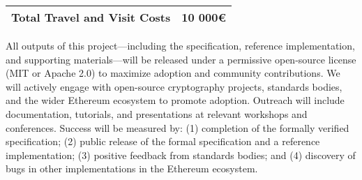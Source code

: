\documentclass{article}
\begin{document}
\begin{table}[t]
\begin{tabular}[t]{|l|r|}
        \hline\hline
        \rowcolor{lightgray}
        \textbf{Total Travel and Visit Costs} & \textbf{10 000\euro{}} \\
        \hline
    \end{tabular}
\end{table}

 All outputs of this project—including the specification, reference implementation, and supporting materials—will be released under a permissive open-source license (MIT or Apache 2.0) to maximize adoption and community contributions. We will actively engage with open-source cryptography projects, standards bodies, and the wider Ethereum ecosystem to promote adoption. Outreach will include documentation, tutorials, and presentations at relevant workshops and conferences. Success will be measured by: (1) completion of the formally verified specification; (2) public release of the formal specification and a reference implementation; (3) positive feedback from standards bodies; and (4) discovery of bugs in other implementations in the Ethereum ecosystem.
\end{document}
